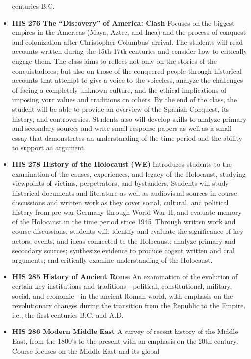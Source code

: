 \documentclass[
  letterpaper,
]{scrbook}
\begin{document}
\begin{itemize}
  centuries B.C.
\item
  \textbf{HIS 276 The ``Discovery'' of America: Clash} Focuses on the
  biggest empires in the Americas (Maya, Aztec, and Inca) and the
  process of conquest and colonization after Christopher Columbus'
  arrival. The students will read accounts written during the 15th-17th
  centuries and consider how to critically engage them. The class aims
  to reflect not only on the stories of the conquistadores, but also on
  those of the conquered people through historical accounts that attempt
  to give a voice to the voiceless, analyze the challenges of facing a
  completely unknown culture, and the ethical implications of imposing
  your values and traditions on others. By the end of the class, the
  student will be able to provide an overview of the Spanish Conquest,
  its history, and controversies. Students also will develop skills to
  analyze primary and secondary sources and write small response papers
  as well as a small essay that demonstrates an understanding of the
  time period and the ability to support an argument.
\item
  \textbf{HIS 278 History of the Holocaust (WE)} Introduces students to
  the examination of the causes, experiences, and legacy of the
  Holocaust, studying viewpoints of victims, perpetrators, and
  bystanders. Students will study historical documents and literature as
  well as audiovisual sources in course discussions and written work as
  they cover social, cultural, and political history from pre-war
  Germany through World War II, and evaluate memory of the Holocaust in
  the time period since 1945. Through written work and course
  discussions, students will: identify and evaluate the significance of
  key actors, events, and ideas connected to the Holocaust; analyze
  primary and secondary sources; synthesize evidence to produce cogent
  written and oral arguments; and critically examine understanding of
  the Holocaust.
\item
  \textbf{HIS 285 History of Ancient Rome} An examination of the
  evolution of certain key institutions and traditions---political,
  constitutional, military, social, and economic---in the ancient Roman
  world, with emphasis on the revolutionary changes during the
  transition from the Republic to the Empire, i.e., the first centuries
  B.C. and A.D.
\item
  \textbf{HIS 286 Modern Middle East} A survey of recent history of the
  Middle East, from the 1800's to the present with an emphasis on the
  20th century. Course focuses on the Middle East and its global

\end{itemize}
\end{document}
